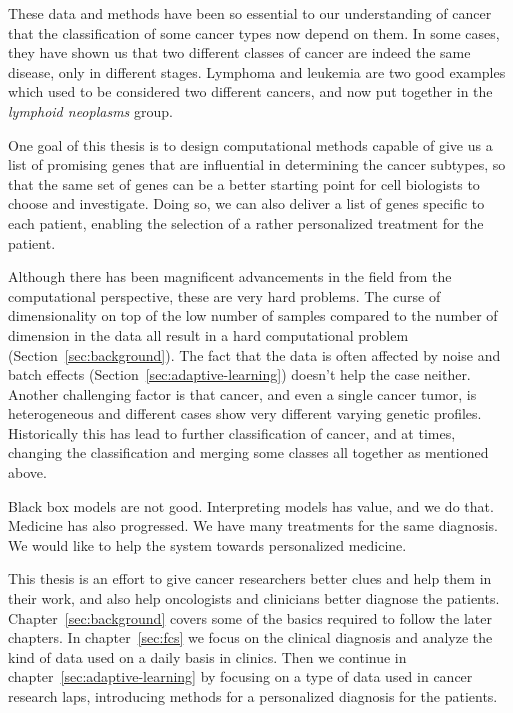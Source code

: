These data and methods have been so essential to our understanding of cancer
that the classification of some cancer types now depend on them. In some cases,
they have shown us that two different classes of cancer are indeed the same
disease, only in different stages. Lymphoma and leukemia are two good examples
which used to be considered two different cancers, and now put together in the
\emph{lymphoid neoplasms} group.

One goal of this thesis is to design computational methods capable of give us a
list of promising genes that are influential in determining the cancer subtypes,
so that the same set of genes can be a better starting point for cell biologists
to choose and investigate. Doing so, we can also deliver a list of genes
specific to each patient, enabling the selection of a rather personalized
treatment for the patient.

Although there has been magnificent advancements in the field from the
computational perspective, these are very hard problems. The curse of
dimensionality on top of the low number of samples compared to the number of
dimension in the data all result in a hard computational problem
(Section~\ref{sec:background}). The fact that the data is often affected by
noise and batch effects (Section~\ref{sec:adaptive-learning}) doesn't help the
case neither. Another challenging factor is that cancer, and even a single
cancer tumor, is heterogeneous and different cases show very different varying
genetic profiles. Historically this has lead to further classification of
cancer, and at times, changing the classification and merging some classes all
together as mentioned above.

Black box models are not good. Interpreting models has value, and we do that.
Medicine has also progressed. We have many treatments for the same diagnosis. We
would like to help the system towards personalized medicine.

This thesis is an effort to give cancer researchers better clues and help them
in their work, and also help oncologists and clinicians better diagnose the
patients. Chapter~\ref{sec:background} covers some of the basics required to
follow the later chapters. In chapter~\ref{sec:fcs} we focus on the clinical
diagnosis and analyze the kind of data used on a daily basis in clinics. Then we
continue in chapter~\ref{sec:adaptive-learning} by focusing on a type of data
used in cancer research laps, introducing methods for a personalized diagnosis
for the patients.
